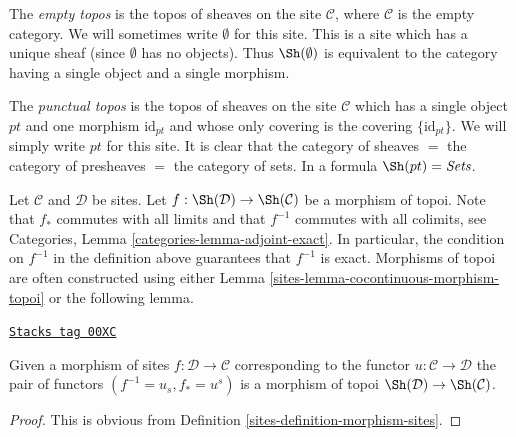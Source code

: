 \medskip\noindent
The {\it empty topos} is the topos
of sheaves on the site $\mathcal{C}$, where $\mathcal{C}$
is the empty category. We will sometimes write $\emptyset$ for this site.
This is a site which has a unique sheaf (since $\emptyset$ has no
objects). Thus $\Sh(\emptyset)$ is equivalent to the category
having a single object and a single morphism.

\medskip\noindent
The {\it punctual topos} is the topos of sheaves on the site
$\mathcal{C}$ which has a single object $pt$ and one morphism
$\text{id}_{pt}$ and whose only covering is the covering
$\{\text{id}_{pt}\}$. We will simply write $pt$ for this site.
It is clear that the category of sheaves $ = $ the category of
presheaves $ = $ the category of sets.
In a formula $\Sh(pt) = \textit{Sets}$.

\medskip\noindent
Let $\mathcal{C}$ and $\mathcal{D}$ be sites. Let
$f : \Sh(\mathcal{D}) \to \Sh(\mathcal{C})$ be a morphism of topoi.
Note that $f_*$ commutes with all limits and that
$f^{-1}$ commutes with all colimits, see Categories,
Lemma \ref{categories-lemma-adjoint-exact}.
In particular, the condition on $f^{-1}$ in the definition above
guarantees that $f^{-1}$ is exact. Morphisms of topoi are often constructed
using either Lemma \ref{sites-lemma-cocontinuous-morphism-topoi}
or the following lemma.

\begin{lemma}
\label{sites-lemma-morphism-sites-topoi}
\href{https://stacks.math.columbia.edu/tag/00XC}{\texttt{Stacks tag 00XC}}

Given a morphism of sites $f : \mathcal{D} \to \mathcal{C}$
corresponding to the functor $u : \mathcal{C} \to \mathcal{D}$
the pair of functors $(f^{-1} = u_s, f_* = u^s)$ is a morphism of topoi
$\Sh(\mathcal{D}) \to \Sh(\mathcal{C})$.
\end{lemma}

\begin{proof}

This is obvious from Definition \ref{sites-definition-morphism-sites}.
\end{proof}

